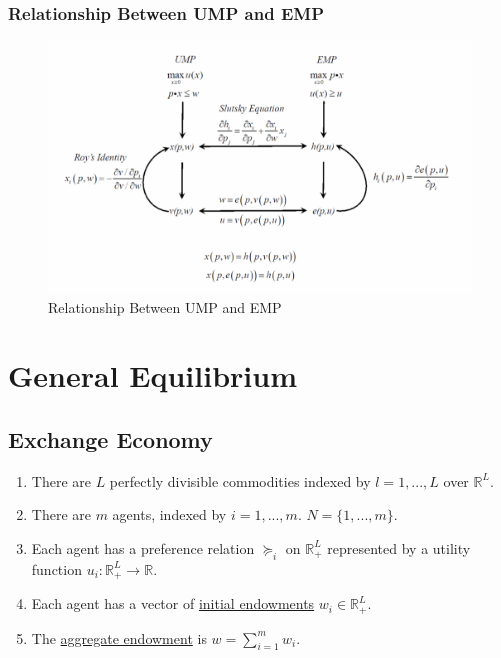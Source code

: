 \documentclass[11pt]{elegantbook}
\begin{document}
\subsection{Relationship Between UMP and EMP}
\begin{figure}[htbp]
    \centering
    \includegraphics[scale=0.6]{UMP-EMP.png}
    \caption{Relationship Between UMP and EMP}
    \label{}
\end{figure}





















\chapter{General Equilibrium}
\section{Exchange Economy}
\begin{enumerate}
    \item There are $L$ perfectly divisible commodities indexed by $l=1,...,L$ over $\mathbb{R}^L$.
    \item There are $m$ agents, indexed by $i=1,...,m$. $N=\{1,...,m\}$.
    \item Each agent has a preference relation $\succeq_i$ on $\mathbb{R}_+^L$ represented by a utility function $u_i: \mathbb{R}_+^L \rightarrow \mathbb{R}$.
    \item Each agent has a vector of \underline{initial endowments} $w_i\in \mathbb{R}_+^L$.
    \item The \underline{aggregate endowment} is $w=\sum_{i=1}^m w_i$.
\end{enumerate}
\end{document}

